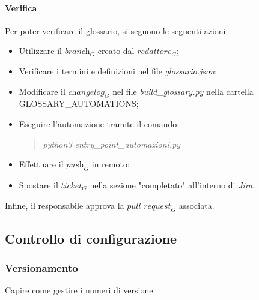 \paragraph{Verifica} Per poter verificare il glossario, si seguono le seguenti azioni:
\begin{itemize}
    \item Utilizzare il $\textit{branch}_G$ creato dal $\textit{redattore}_G$;
    \item Verificare i termini e definizioni nel file \emph{glossario.json};
    \item Modificare il $\textit{changelog}_G$ nel file \emph{build\_glossary.py} nella cartella GLOSSARY\_AUTOMATIONS;
    \item Eseguire l'automazione tramite il comando:
        \begin{quote}
            \emph{  python3 entry\_point\_automazioni.py} 
        \end{quote}
    \item Effettuare il $\textit{push}_G$ in remoto;
    \item Spostare il $\textit{ticket}_G$ nella sezione "completato" all'interno di \emph{Jira}.
\end{itemize}
Infine, il responsabile approva la $\textit{pull request}_G$ associata.

\subsection{Controllo di configurazione}
\subsubsection{Versionamento}
Capire come gestire i numeri di versione.
